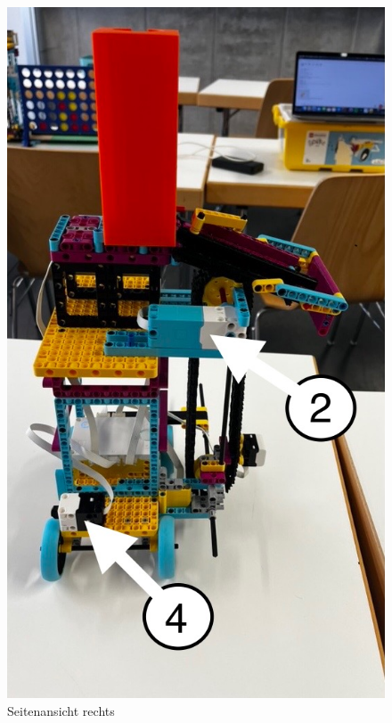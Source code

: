 \begin{figure}[H]
	\centering
	\includegraphics[width=0.5\linewidth]{images/DAE26A50-277E-4C6B-96A3-F2DE2CC9C004_1_105_c}
	\caption{Seitenansicht rechts}
	\label{fig:dae26a50-277e-4c6b-96a3-f2de2cc9c0041105c}
\end{figure}

